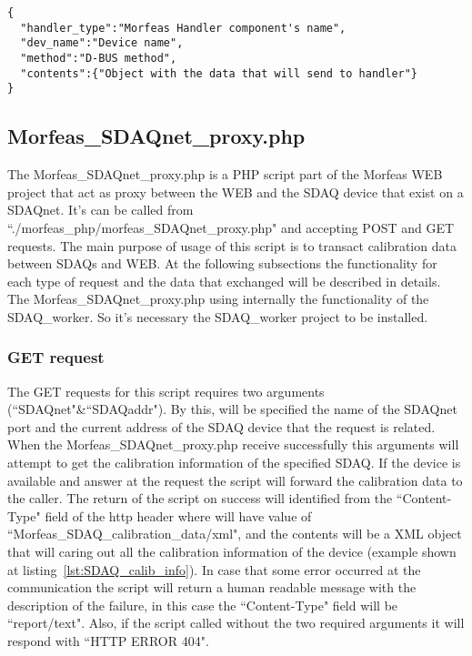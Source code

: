 \begin{lstlisting}[frame=single,caption=Structure of contents for POST request for Morfeas\_dbus\_proxy.php,label=lst:dbus_proxy]
{
  "handler_type":"Morfeas Handler component's name",
  "dev_name":"Device name",
  "method":"D-BUS method",
  "contents":{"Object with the data that will send to handler"}
}
\end{lstlisting}

\subsection{Morfeas\_SDAQnet\_proxy.php}
The Morfeas\_SDAQnet\_proxy.php is a PHP script part of the Morfeas WEB project that act as proxy between the WEB and the SDAQ device that exist on a SDAQnet.
It's can be called from ``./morfeas\_php/morfeas\_SDAQnet\_proxy.php" and accepting POST and GET requests.
The main purpose of usage of this script is to transact calibration data between SDAQs and WEB.
At the following subsections the functionality for each type of request and the data that exchanged will be described in details.\\

The Morfeas\_SDAQnet\_proxy.php using internally the functionality of the SDAQ\_worker. So it's necessary the SDAQ\_worker project to be installed.

\subsubsection{GET request}
The GET requests for this script requires two arguments (``SDAQnet"\&``SDAQaddr").
By this, will be specified the name of the SDAQnet port and the current address of the SDAQ device that the request is related.
When the Morfeas\_SDAQnet\_proxy.php receive successfully this arguments will attempt to get the calibration information of the specified SDAQ.
If the device is available and answer at the request the script will forward the calibration data to the caller.
The return of the script on success will identified from the ``Content-Type" field of the http header where will have value of ``Morfeas\_SDAQ\_calibration\_data/xml",
and the contents will be a XML object that will caring out all the calibration information of the device (example shown at listing~\ref{lst:SDAQ_calib_info}).
In case that some error occurred at the communication the script will return a human readable message with the description of the failure,
in this case the ``Content-Type" field will be ``report/text".
Also, if the script called without the two required arguments it will respond with ``HTTP ERROR 404".

